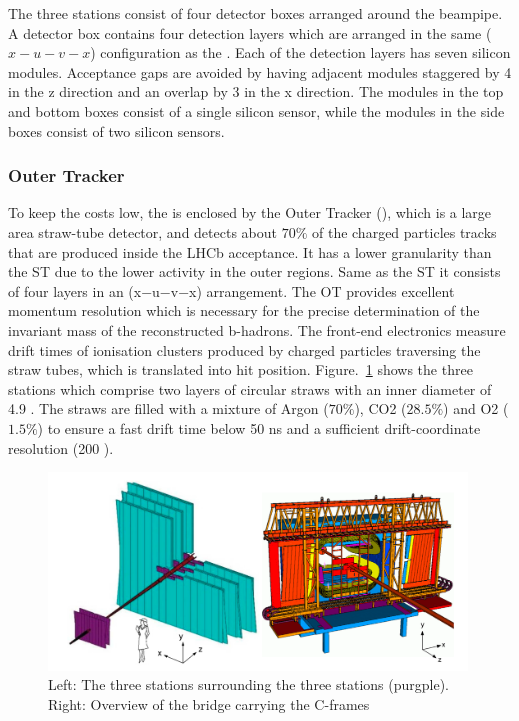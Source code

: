 The three \intr stations consist of four detector boxes arranged around the beampipe.
A detector box contains four detection layers which are arranged in the same ($x-u-v-x$) configuration as the \ttracker. 
Each of the detection layers has seven silicon modules. 
Acceptance gaps are avoided by having adjacent modules staggered by 4 \mm in the z direction and an overlap by 3 \mm in the x direction. 
The modules in the top and bottom boxes consist of a single silicon sensor, 
while the modules in the side boxes consist of two silicon sensors.


\subsubsection{Outer Tracker}

To keep the costs low, 
the \intr is enclosed by the Outer Tracker (\ot), 
which is a large area straw-tube detector, 
and detects about $70\%$ of the charged particles tracks that are produced inside the LHCb acceptance. 
It has a lower granularity than the ST due to the lower activity in the outer regions. 
Same as the ST it consists of four layers in an (x−u−v−x) arrangement. 
The OT provides excellent momentum resolution which is necessary for the precise determination of the invariant mass of the reconstructed b-hadrons. 
The front-end electronics measure drift times of ionisation clusters produced by charged particles traversing the straw tubes, 
which is translated into hit position. 
Figure.~\ref{fig:TT} shows the three \ot stations which comprise two layers of circular straws with an inner diameter of 4.9 \mm. 
The straws are filled with a mixture of Argon ($70\%$), CO2 ($28.5\%$) and O2 ($1.5\%$) 
to ensure a fast drift time below 50 ns and a sufficient drift-coordinate resolution (200 \mum).

\begin{figure}[!hbtp]
\centering
\includegraphics[width=0.99\textwidth]{Figures/02_Detector/TT}%
   \caption{ Left: The three \ot stations surrounding the three \intr stations (purgple). 
	Right: Overview of the \ot bridge carrying the C-frames\supercite{LHCb-DP-2008-001}}
\label{fig:TT}
\end{figure}


